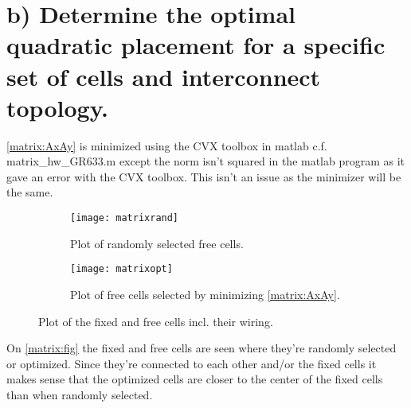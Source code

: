 \section{b) Determine the optimal quadratic placement for a specific set of cells and interconnect topology.}
\autoref{matrix:AxAy} is minimized using the CVX toolbox in matlab c.f. matrix_hw_GR633.m except the norm isn't squared in the matlab program as it gave an error with the CVX toolbox. This isn't an issue as the minimizer will be the same.

\begin{figure}[htbp]
\centering
\begin{subfigure}{0.45\textwidth}
\texttt{[image: matrixrand]}
\caption{Plot of randomly selected free cells.}
\end{subfigure}
\begin{subfigure}{0.45\textwidth}
\texttt{[image: matrixopt]}
\caption{Plot of free cells selected by minimizing \autoref{matrix:AxAy}.}
\end{subfigure}
\caption{Plot of the fixed and free cells incl. their wiring.}
\label{matrix:fig}
\end{figure}

On \autoref{matrix:fig} the fixed and free cells are seen where they're randomly selected or optimized. Since they're connected to each other and/or the fixed cells it makes sense that the optimized cells are closer to the center of the fixed cells than when randomly selected.